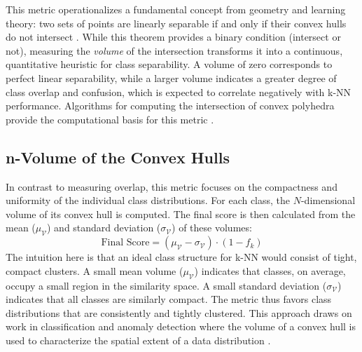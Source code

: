 \documentclass[conference]{IEEEtran}
\begin{document}
This metric operationalizes a fundamental concept from geometry and learning theory: two sets of points are linearly separable if and only if their convex hulls do not intersect \cite{b27, b28}. While this theorem provides a binary condition (intersect or not), measuring the \textit{volume} of the intersection transforms it into a continuous, quantitative heuristic for class separability. A volume of zero corresponds to perfect linear separability, while a larger volume indicates a greater degree of class overlap and confusion, which is expected to correlate negatively with k-NN performance. Algorithms for computing the intersection of convex polyhedra provide the computational basis for this metric \cite{b29, b30}.

\subsection{n-Volume of the Convex Hulls}
In contrast to measuring overlap, this metric focuses on the compactness and uniformity of the individual class distributions. For each class, the $N$-dimensional volume of its convex hull is computed. The final score is then calculated from the mean ($\mu_{\mathcal{V}}$) and standard deviation ($\sigma_{\mathcal{V}}$) of these volumes:
$$\text{Final Score} = (\mu_{\mathcal{V}} - \sigma_{\mathcal{V}}) \cdot (1 - f_k)$$
The intuition here is that an ideal class structure for k-NN would consist of tight, compact clusters. A small mean volume ($\mu_{\mathcal{V}}$) indicates that classes, on average, occupy a small region in the similarity space. A small standard deviation ($\sigma_{\mathcal{V}}$) indicates that all classes are similarly compact. The metric thus favors class distributions that are consistently and tightly clustered. This approach draws on work in classification and anomaly detection where the volume of a convex hull is used to characterize the spatial extent of a data distribution \cite{b31, b32, b33}.
\end{document}
